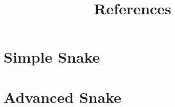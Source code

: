 \documentclass[10pt,a4paper,oneside]{report}
\begin{document}
\graphicspath{{pics/}}

\newpage
\tableofcontents
\newpage

\chapter{Simple Snake}
\newpage
\newpage
\newpage
\newpage

\chapter{Advanced Snake}
\newpage
\newpage
\newpage
\newpage

\newpage

\appendix
\newpage

\title{References}


\end{document}
